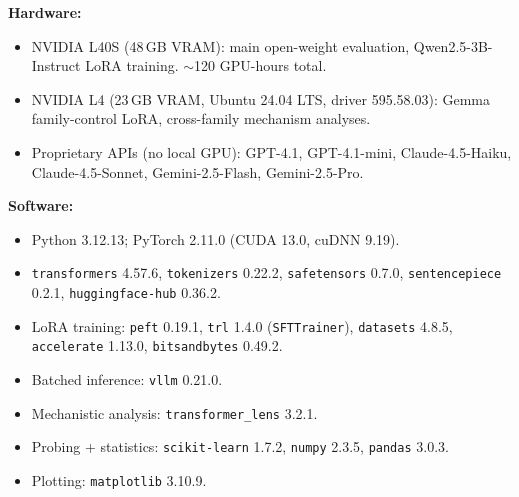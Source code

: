 \documentclass[11pt]{article}
\begin{document}
\textbf{Hardware:}
\begin{itemize}\setlength\itemsep{0pt}
\item NVIDIA L40S (48\,GB VRAM): main open-weight evaluation,
  Qwen2.5-3B-Instruct LoRA training. $\sim$120 GPU-hours total.
\item NVIDIA L4 (23\,GB VRAM, Ubuntu 24.04 LTS, driver 595.58.03):
  Gemma family-control LoRA, cross-family mechanism analyses.
\item Proprietary APIs (no local GPU): GPT-4.1, GPT-4.1-mini,
  Claude-4.5-Haiku, Claude-4.5-Sonnet, Gemini-2.5-Flash,
  Gemini-2.5-Pro.
\end{itemize}

\textbf{Software:}
\begin{itemize}\setlength\itemsep{0pt}
\item Python 3.12.13; PyTorch 2.11.0 (CUDA 13.0, cuDNN 9.19).
\item \texttt{transformers} 4.57.6, \texttt{tokenizers} 0.22.2,
  \texttt{safetensors} 0.7.0, \texttt{sentencepiece} 0.2.1,
  \texttt{huggingface-hub} 0.36.2.
\item LoRA training: \texttt{peft} 0.19.1, \texttt{trl} 1.4.0
  (\texttt{SFTTrainer}), \texttt{datasets} 4.8.5,
  \texttt{accelerate} 1.13.0, \texttt{bitsandbytes} 0.49.2.
\item Batched inference: \texttt{vllm} 0.21.0.
\item Mechanistic analysis: \texttt{transformer\_lens} 3.2.1.
\item Probing + statistics: \texttt{scikit-learn} 1.7.2,
  \texttt{numpy} 2.3.5, \texttt{pandas} 3.0.3.
\item Plotting: \texttt{matplotlib} 3.10.9.
\end{itemize}
\end{document}
